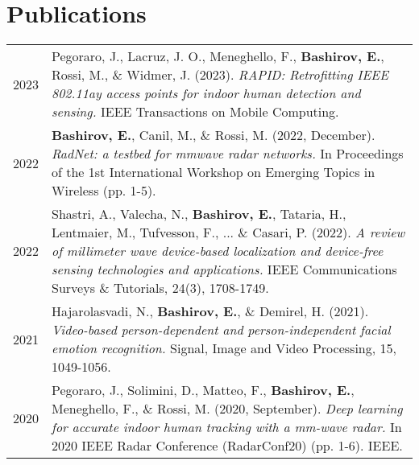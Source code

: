 \documentclass[lighthipster]{simplehipstercv}
\begin{document}
\clearpage

\section*{Publications}
\begin{tabular}{l | >{\footnotesize}p{}}

    2023 & Pegoraro, J., Lacruz, J. O., Meneghello, F., \textbf{Bashirov, E.}, Rossi, M., \& Widmer, J. (2023). \emph{RAPID: Retrofitting IEEE 802.11ay access points for indoor human detection and sensing.} IEEE Transactions on Mobile Computing. \\
    
    2022 & \textbf{Bashirov, E.}, Canil, M., \& Rossi, M. (2022, December). \emph{RadNet: a testbed for mmwave radar networks.} In Proceedings of the 1st International Workshop on Emerging Topics in Wireless (pp. 1-5). \\
    
    2022 & Shastri, A., Valecha, N., \textbf{Bashirov, E.}, Tataria, H., Lentmaier, M., Tufvesson, F., ... \& Casari, P. (2022). \emph{A review of millimeter wave device-based localization and device-free sensing technologies and applications.} IEEE Communications Surveys \& Tutorials, 24(3), 1708-1749. \\
    
    2021 & Hajarolasvadi, N., \textbf{Bashirov, E.}, \& Demirel, H. (2021). \emph{Video-based person-dependent and person-independent facial emotion recognition.} Signal, Image and Video Processing, 15, 1049-1056. \\

    2020 & Pegoraro, J., Solimini, D., Matteo, F., \textbf{Bashirov, E.}, Meneghello, F., \& Rossi, M. (2020, September). \emph{Deep learning for accurate indoor human tracking with a mm-wave radar.} In 2020 IEEE Radar Conference (RadarConf20) (pp. 1-6). IEEE. \\

\end{tabular}

\bigskip


\end{document}
